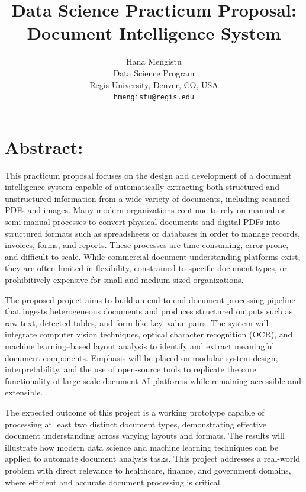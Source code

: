 \documentclass[12pt, onecolumn]{IEEEtran}
\begin{document}
\title{Data Science Practicum Proposal: Document Intelligence System}
\author{Hana Mengistu \\ 
        Data Science Program \\
        Regis University, Denver, CO, USA \\ 
        \texttt{hmengistu@regis.edu}}
\maketitle

\section{\textbf{Abstract:}}
This practicum proposal focuses on the design and development of a document intelligence system capable of automatically extracting both structured and unstructured information from a wide variety of documents, including scanned PDFs and images. Many modern organizations continue to rely on manual or semi-manual processes to convert physical documents and digital PDFs into structured formats such as spreadsheets or databases in order to manage records, invoices, forms, and reports. These processes are time-consuming, error-prone, and difficult to scale. While commercial document understanding platforms exist, they are often limited in flexibility, constrained to specific document types, or prohibitively expensive for small and medium-sized organizations.

The proposed project aims to build an end-to-end document processing pipeline that ingests heterogeneous documents and produces structured outputs such as raw text, detected tables, and form-like key–value pairs. The system will integrate computer vision techniques, optical character recognition (OCR), and machine learning–based layout analysis to identify and extract meaningful document components. Emphasis will be placed on modular system design, interpretability, and the use of open-source tools to replicate the core functionality of large-scale document AI platforms while remaining accessible and extensible.

The expected outcome of this project is a working prototype capable of processing at least two distinct document types, demonstrating effective document understanding across varying layouts and formats. The results will illustrate how modern data science and machine learning techniques can be applied to automate document analysis tasks. This project addresses a real-world problem with direct relevance to healthcare, finance, and government domains, where efficient and accurate document processing is critical.
\end{document}
